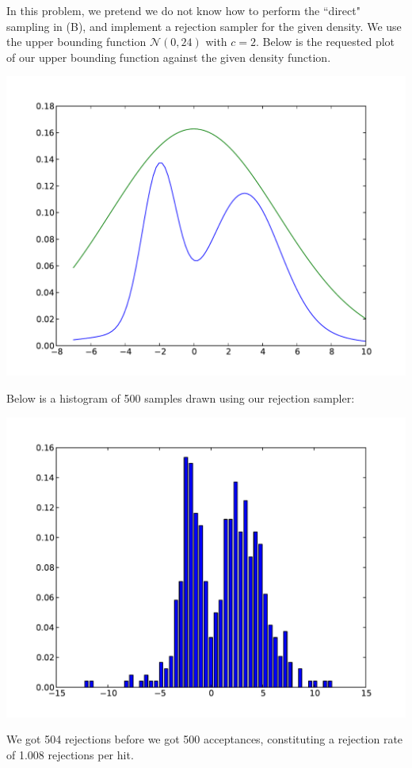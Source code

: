 \documentclass[solution, letterpaper]{cs121}
\begin{document}
\begin{empfile}
\subproblem %
In this problem, we pretend we do not know how to perform the ``direct" sampling in (B), and implement a rejection sampler for the given density. We use the upper bounding function $\mathcal{N}(0,24)$ with $c=2$. Below is the requested plot of our upper bounding function against the given density function.
\begin{center}
\includegraphics[scale=0.8]{mixture-w-envelope.pdf}
\end{center}

Below is a histogram of 500 samples drawn using our rejection sampler:
\begin{center}
\includegraphics[scale=0.8]{rejection-sample-histogram.pdf}
\end{center}

We got 504 rejections before we got 500 acceptances, constituting a rejection rate of 1.008 rejections per hit.

\end{empfile}

\immediate{}
\end{document}
